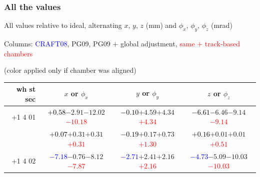 \documentclass[compress]{beamer}
\begin{document}
\begin{frame}
\frametitle{All the values}
\tiny

All values relative to ideal, alternating $x$, $y$, $z$ (mm) and $\phi_x$, $\phi_y$, $\phi_z$ (mrad)

Columns: \textcolor{blue}{CRAFT08}, PG09, PG09 $+$ global adjustment, \textcolor{red}{same $+$ track-based chambers}

\hfill (color applied only if chamber was aligned)

\vfill
\renewcommand{\arraystretch}{1.1}
\begin{tabular}{r | c | c | c}
wh st sec & $x$ or $\phi_x$ & $y$ or $\phi_y$ & $z$ or $\phi_z$ \\\hline
$+$1 4 01 & \textcolor{black}{$+0.58$}\hspace{0.1 cm}$-2.91$\hspace{0.1 cm}$-12.02$\hspace{0.1 cm}\textcolor{red}{$-10.18$} & \textcolor{black}{$-0.10$}\hspace{0.1 cm}$+4.59$\hspace{0.1 cm}$+4.34$\hspace{0.1 cm}\textcolor{red}{$+4.34$} & \textcolor{black}{$-6.61$}\hspace{0.1 cm}$-6.46$\hspace{0.1 cm}$-9.14$\hspace{0.1 cm}\textcolor{red}{$-9.14$} \\
          & \textcolor{black}{$+0.07$}\hspace{0.1 cm}$+0.31$\hspace{0.1 cm}$+0.31$\hspace{0.1 cm}\textcolor{red}{$+0.31$} & \textcolor{black}{$-0.19$}\hspace{0.1 cm}$+0.17$\hspace{0.1 cm}$+0.73$\hspace{0.1 cm}\textcolor{red}{$+1.30$} & \textcolor{black}{$+0.16$}\hspace{0.1 cm}$+0.01$\hspace{0.1 cm}$+0.01$\hspace{0.1 cm}\textcolor{red}{$+0.51$} \\
$+$1 4 02 & \textcolor{blue}{$-7.18$}\hspace{0.1 cm}$-0.76$\hspace{0.1 cm}$-8.12$\hspace{0.1 cm}\textcolor{red}{$-7.87$} & \textcolor{blue}{$-2.71$}\hspace{0.1 cm}$+2.41$\hspace{0.1 cm}$+2.16$\hspace{0.1 cm}\textcolor{red}{$+2.16$} & \textcolor{blue}{$-4.73$}\hspace{0.1 cm}$-5.09$\hspace{0.1 cm}$-10.03$\hspace{0.1 cm}\textcolor{red}{$-10.03$} \\

\end{tabular}
\end{frame}
\end{document}
